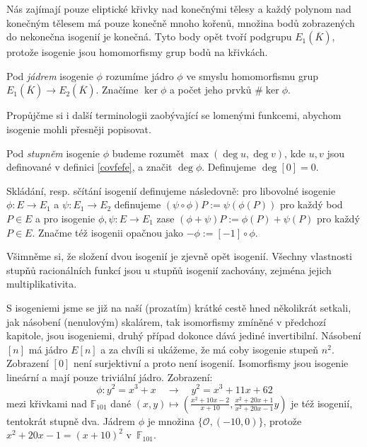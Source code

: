 \documentclass[12pt]{report}
\begin{document}
Nás zajímají pouze eliptické křivky nad konečnými tělesy a každý polynom nad konečným tělesem má pouze konečně mnoho kořenů, množina bodů zobrazených do nekonečna isogenií je konečná. Tyto body opět tvoří podgrupu $E_1 (\overline{K})$, protože isogenie jsou homomorfismy grup bodů na křivkách.

\begin{definice}
Pod \textit{jádrem} isogenie $\phi$ rozumíme jádro $\phi$ ve smyslu homomorfismu grup $E_1 (\overline{K})\longrightarrow E_2(\overline{K})$. Značíme $\ker \phi$ a počet jeho prvků $\# \ker \phi$. 
\end{definice}

Propůjčme si i další terminologii zaobývající se lomenými funkcemi, abychom isogenie mohli přesněji popisovat.

\begin{definice}
Pod \textit{stupněm} isogenie $\phi$ budeme rozumět $\max (\deg u, \deg v)$, kde $u,v$ jsou definované v definici \ref{covfefe}, a značit $\deg \phi$. Definujeme $\deg [0] = 0$. 
\end{definice}
 
\begin{znaceni}
Skládání, resp. sčítání isogenií definujeme následovně: pro libovolné isogenie $\phi : E \longrightarrow E_1$ a $\psi : E_1 \longrightarrow E_2$ definujeme $(\psi \circ \phi) P  := \psi(\phi( P))$ pro každý bod $P \in E$ a pro isogenie $\phi,\psi : E \longrightarrow E_1$ zase $(\phi + \psi)P := \phi(P)+\psi(P)$ pro každý $P \in E$. Značme též isogenii opačnou jako $- \phi := [-1] \circ \phi$.
\end{znaceni}

Všimněme si, že složení dvou isogenií je zjevně opět isogenií. Všechny vlastnosti stupňů racionálních funkcí jsou u stupňů isogenií zachovány, zejména jejich multiplikativita.


S isogeniemi jsme se již na naší (prozatím) krátké cestě hned několikrát setkali, jak násobení (nenulovým) skalárem, tak isomorfismy zmíněné v předchozí kapitole, jsou isogeniemi, druhý případ dokonce dává jediné invertibilní. Násobení $[n]$ má jádro $E[n]$ a za chvíli si ukážeme, že má coby isogenie stupeň $n^2$. Zobrazení $[0]$ není surjektivní a proto není isogenií. Isomorfismy jsou isogenie lineární a mají pouze triviální jádro. Zobrazení:
\begin{equation*}
\phi : y^2 = x^3+x \quad \longrightarrow \quad y^2 =  x^3 + 11x + 62
\end{equation*}
mezi křivkami nad $\mathbb{F}_{101}$ dané $(x,y) \mapsto \left(\frac{x^2 + 10x - 2}{x+10},\frac{x^2  + 20x + 1}{x^2 + 20x - 1} y\right)$ je též isogenií, tentokrát stupně dva. Jádrem $\phi$ je množina $\lbrace \mathcal{O},(-10,0) \rbrace$, protože $x^2 + 20x - 1 = (x+10)^2$ v~$\mathbb{F}_{101}$.
\end{document}
